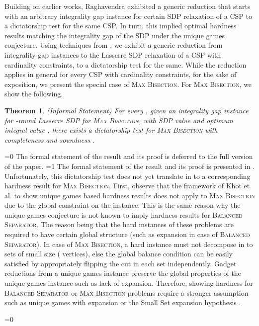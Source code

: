 \documentclass[11pt]{article}
\def\full{1}
\newtheorem{theorem}{Theorem}[section]
\theoremstyle{definition}
\newcommand{\etal}{et al.\xspace}
\newcommand{\problemmacro}[1]{\texorpdfstring{\textsc{#1}}{#1}\xspace}
\newcommand{\balancedseparator}{\problemmacro{Balanced Separator}}
\newcommand{\maxbisection}{\problemmacro{Max Bisection}}
\numberwithin{equation}{section}
\let\pref=\prettyref
\begin{document}
Building on earlier works, Raghavendra \cite{Raghavendra08} exhibited
a generic reduction that starts with an arbitrary integrality gap
instance for certain SDP relaxation of a CSP to a dictatorship test for the same CSP.
In turn, this implied optimal hardness results matching the
integrality gap of the SDP under the unique games conjecture.
Using techniques from \cite{Raghavendra08}, we exhibit a generic
reduction from integrality gap instances to the Lasserre SDP
relaxation of a CSP with cardinality constraints, to a dictatorship
test for the same.  While the reduction applies in general for every
CSP with cardinality constraints, for the sake of exposition, we
present the special case of \maxbisection.  For \maxbisection, we show
the following.
\begin{theorem}(Informal Statement)
For every , given an integrality gap instance for
-round Lasserre SDP for \maxbisection, with SDP
value  and optimum integral value , there exists a dictatorship
test for \maxbisection with completeness  and
soundness .
\end{theorem}
\ifnum\full=0
The formal statement of the result and its proof is deferred to the
full version of the paper.
\fi
\ifnum\full=1
The formal statement of the result  and its proof is presented in
\pref{sec:gaptodict}.
\fi
Unfortunately, this dictatorship test does not yet translate in to a
corresponding hardness result for \maxbisection.
First, observe that the framework of Khot \etal \cite{KhotKMO07} to
show unique games based hardness results does not apply to
\maxbisection due to the global constraint on the instance.
This is the same reason why the unique games conjecture is not known to imply
hardness results for \balancedseparator.   The reason being that the hard instances of these problems are
required to have certain global structure (such as expansion in case of
\balancedseparator).  In case of \maxbisection, a hard instance must
not decompose in to sets of small size ( vertices), else
the global balance condition can be easily satisfied by appropriately
flipping the cut in each set independently.  Gadget reductions from a unique games instance
preserve the global properties of the unique games instance such as lack of expansion. Therefore, showing
hardness for \balancedseparator or \maxbisection problems require a
stronger assumption such as unique games with expansion or the Small
Set expansion hypothesis \cite{RaghavendraS10}.

\ifnum\full=0 \vspace{-8pt}\fi
\end{document}
